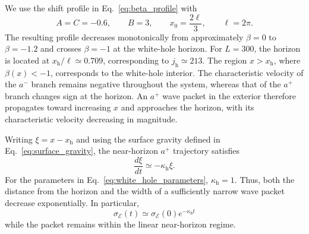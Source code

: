 \documentclass[reprint,amsmath,amssymb,aps,prb,showkeys,superscriptaddress]{revtex4-2}
\begin{document}
We use the shift profile in Eq.~\eqref{eq:beta_profile} with
\begin{equation}
  A=C=-0.6,
  \qquad
  B=3,
  \qquad
  x_0=\frac{2\ell}{3},
  \qquad
  \ell=2\pi.
  \label{eq:white_hole_parameters}
\end{equation}
The resulting profile decreases monotonically from approximately
$\beta=0$ to $\beta=-1.2$ and crosses $\beta=-1$ at the
white-hole horizon. For $L=300$, the horizon is located at
$x_{\mathrm h}/\ell\simeq0.709$, corresponding to
$j_{\mathrm h}\simeq213$. The region $x>x_{\mathrm h}$, where
$\beta(x)<-1$, corresponds to the white-hole interior. The
characteristic velocity of the $a^-$ branch remains negative
throughout the system, whereas that of the $a^+$ branch changes
sign at the horizon. An $a^+$ wave packet in the exterior therefore
propagates toward increasing $x$ and approaches the horizon, with
its characteristic velocity decreasing in magnitude.

Writing $\xi=x-x_{\mathrm h}$ and using the surface gravity defined
in Eq.~\eqref{eq:surface_gravity}, the near-horizon $a^+$
trajectory satisfies
\begin{equation}
  \frac{d\xi}{dt}
  \simeq
  -\kappa_{\mathrm h}\xi.
  \label{eq:white_hole_near_horizon}
\end{equation}
For the parameters in Eq.~\eqref{eq:white_hole_parameters},
$\kappa_{\mathrm h}=1$. Thus, both the distance from the horizon
and the width of a sufficiently narrow wave packet decrease
exponentially. In particular,
\begin{equation}
  \sigma_{\mathcal E}(t)
  \simeq
  \sigma_{\mathcal E}(0)
  e^{-\kappa_{\mathrm h}t}
  \label{eq:white_hole_compression}
\end{equation}
while the packet remains within the linear near-horizon regime.
\end{document}
